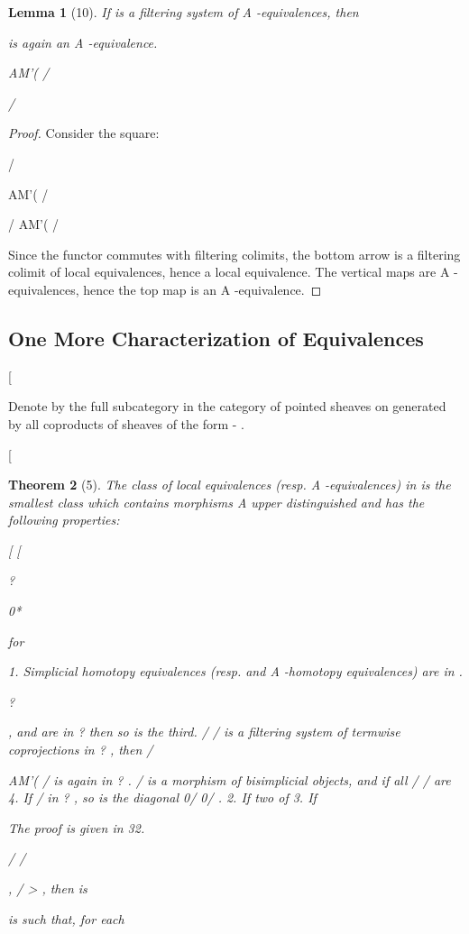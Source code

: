\documentclass[11pt,a4paper]{article}
\theoremstyle{plain}
\newtheorem{theorem}{Theorem}
\newtheorem{lemma}[theorem]{Lemma}
\theoremstyle{definition}
\begin{document}
\begin{lemma}[10]
If 
is a filtering system of A -equivalences, then


is again an A -equivalence.


AM'( /

/

\end{lemma}

\begin{proof} Consider the square:

/






AM'( / 




/    AM'( /  


Since the functor
commutes with filtering colimits, the bottom arrow is a filtering colimit of local equivalences, hence a local equivalence. The vertical maps are
A -equivalences, hence the top map is an A -equivalence.


\end{proof}

\subsection{One More Characterization of Equivalences}


[ 

Denote by
the full subcategory in the category of pointed sheaves on
generated by all coproducts of sheaves of the form - .

[

 

\begin{theorem}[5]
The class of local equivalences (resp. A -equivalences) in
is the smallest class
which contains morphisms
A
upper distinguished and has the following properties:

[ 
[

?

 

0*

 for

1. Simplicial homotopy equivalences (resp. and A -homotopy equivalences) are
in .

?



 ,  and  are in ? then so is the third.
/
/  is a filtering system of termwise coprojections in ? , then / 

AM'( / is again in ? .
/  is a morphism of bisimplicial objects, and if all /  /   are
4. If /
in ? , so is the diagonal 0/ 
0/ .
2. If two of
3. If 

The proof is given in 32.

 /
/

 , / 
 >  , then  is

is such that, for each
\end{theorem}
\end{document}
